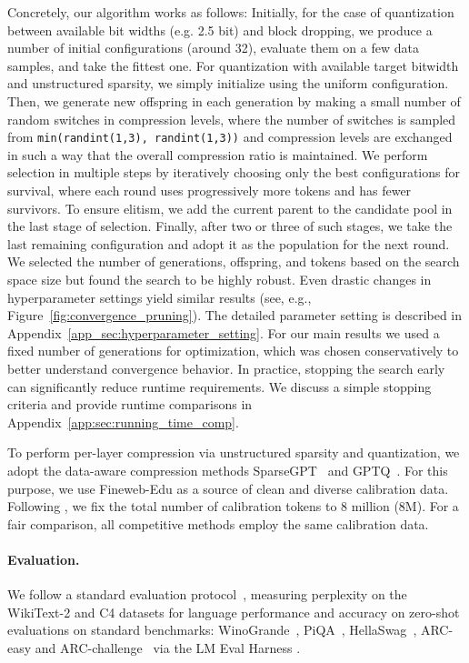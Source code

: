 \documentclass{article}
\theoremstyle{plain}
\theoremstyle{definition}
\theoremstyle{remark}
\newcommand{\methodname}{EvoPress}
\begin{document}
Concretely, our algorithm works as follows: Initially, for the case of quantization between available bit widths (e.g. 2.5 bit) and block dropping, we produce a number of initial configurations (around 32), evaluate them on a few data samples, and take the fittest one. For quantization with available target bitwidth and unstructured sparsity, we simply initialize using the uniform configuration. Then, we generate new offspring in each generation by making a small number of random switches in compression levels, where the number of switches is sampled from \texttt{min(randint(1,3), randint(1,3))} and compression levels are exchanged in such a way that the overall compression ratio is maintained. We perform selection in multiple steps by iteratively choosing only the best configurations for survival, where each round uses progressively more tokens and has fewer survivors. To ensure elitism, we add the current parent to the candidate pool in the last stage of selection. Finally, after two or three of such stages, we take the last remaining configuration and adopt it as the population for the next round. We selected the number of generations, offspring, and tokens based on the search space size but found the search to be highly robust. Even drastic changes in hyperparameter settings yield similar results (see, e.g., Figure~\ref{fig:convergence_pruning}). The detailed parameter setting is described in Appendix~\ref{app_sec:hyperparameter_setting}. For our main results we used a fixed number of generations for optimization, which was chosen conservatively to better understand convergence behavior. In practice, stopping the search early can significantly reduce runtime requirements. We discuss a simple stopping criteria and provide runtime comparisons in Appendix~\ref{app:sec:running_time_comp}.


To perform per-layer compression via unstructured sparsity and quantization, we adopt the data-aware compression methods SparseGPT~\citep{frantar2023massive} and
GPTQ~\citep{frantar2022gptq}. For this purpose, we use Fineweb-Edu \citep{penedo2024finewebdatasetsdecantingweb} as a source of clean and diverse calibration data. Following \citet{egiazarian2024extreme}, we fix the total number of calibration tokens to 8 million (8M). For a fair comparison, all competitive methods employ the same calibration data.%

\paragraph{Evaluation.} We follow a standard  evaluation protocol~\citep{frantar2022gptq}, measuring perplexity  on the WikiText-2 \citep{merity2016pointer} and C4 \citep{raffel2019exploring} datasets for language performance and accuracy on zero-shot evaluations on standard benchmarks:  WinoGrande~\citep{DBLP:journals/cacm/winogrande2021}, PiQA~\citep{tata2003piqa}, HellaSwag~\citep{DBLP:conf/acl/hellaswag2019}, ARC-easy and ARC-challenge~\citep{arc_allenai} via the LM Eval Harness \citep{eval-harness}.  
\end{document}

